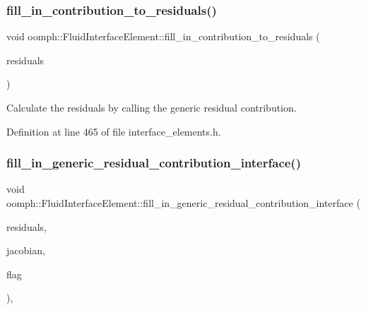 \subsubsection{\texorpdfstring{fill\+\_\+in\+\_\+contribution\+\_\+to\+\_\+residuals()}{fill\_in\_contribution\_to\_residuals()}}
{\footnotesize\ttfamily void oomph\+::\+Fluid\+Interface\+Element\+::fill\+\_\+in\+\_\+contribution\+\_\+to\+\_\+residuals (\begin{DoxyParamCaption}\item[{Vector$<$ double $>$ \&}]{residuals }\end{DoxyParamCaption})\hspace{0.3cm}{\ttfamily [inline]}}



Calculate the residuals by calling the generic residual contribution. 



Definition at line 465 of file interface\+\_\+elements.\+h.

\mbox{\label{classoomph_1_1FluidInterfaceElement_ae4ea3a18a513bed3725fdf413cf18874}} 
\subsubsection{\texorpdfstring{fill\+\_\+in\+\_\+generic\+\_\+residual\+\_\+contribution\+\_\+interface()}{fill\_in\_generic\_residual\_contribution\_interface()}}
{\footnotesize\ttfamily void oomph\+::\+Fluid\+Interface\+Element\+::fill\+\_\+in\+\_\+generic\+\_\+residual\+\_\+contribution\+\_\+interface (\begin{DoxyParamCaption}\item[{Vector$<$ double $>$ \&}]{residuals,  }\item[{Dense\+Matrix$<$ double $>$ \&}]{jacobian,  }\item[{unsigned}]{flag }\end{DoxyParamCaption})\hspace{0.3cm}{\ttfamily [protected]}, {\ttfamily [virtual]}}



